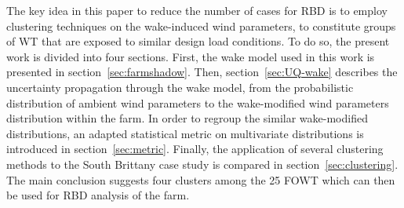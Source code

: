 The key idea in this paper to reduce the number of cases for RBD is to employ clustering techniques on the wake-induced wind parameters, to constitute groups of WT that are exposed to similar design load conditions. To do so, the present work is divided into four sections. First, the wake model used in this work is presented in section~\ref{sec:farmshadow}. Then, section~\ref{sec:UQ-wake} describes the uncertainty propagation through the wake model, from the probabilistic distribution of ambient wind parameters to the wake-modified wind parameters distribution within the farm. In order to regroup the similar wake-modified distributions, an adapted statistical metric on multivariate distributions is introduced in section~\ref{sec:metric}. Finally, the application of several clustering methods to the South Brittany case study is compared in section~\ref{sec:clustering}. The main conclusion suggests four clusters among the 25 FOWT which can then be used for RBD analysis of the farm.


